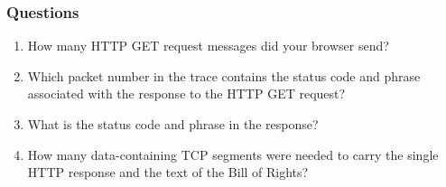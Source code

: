     \subsubsection*{Questions}
        \begin{enumerate}[label=\bfseries Problem \arabic*:,leftmargin=*,labelindent=1em]
        \addtocounter{enumi}{11}
            \item How many HTTP GET request messages did your browser send? \\[0.2mm]
            \soln
            
            \item Which packet number in the trace contains the status code and phrase associated with the response to the HTTP GET request?\\[0.2mm]
            \soln
            
            \item What is the status code and phrase in the response?\\[0.2mm]
            \soln
            
            \item How many data-containing TCP segments were needed to carry
            the single HTTP response and the text of the Bill of Rights? \\[0.2mm]
            \soln
            
        \end{enumerate}
\newpage